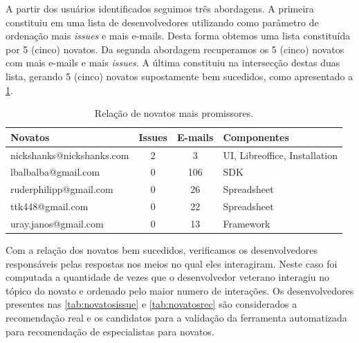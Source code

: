 \documentclass[oneside,brazil,a4paper]{normas-utf-tex}
\begin{document}
A partir dos usuários identificados seguimos três abordagens. A primeira constituiu em uma lista de desenvolvedores utilizando como parâmetro de ordenação mais \textit{issues} e mais e-mails. Desta forma obtemos uma lista constituída por 5 (cinco) novatos. Da segunda abordagem recuperamos os 5 (cinco) novatos com mais e-mails e mais \textit{issues}. A última constituiu na intersecção destas duas lista, gerando 5 (cinco) novatos supostamente bem sucedidos, como apresentado a \cref{tab:novatossucedidos}.

\begin{table}[hbt]
    \centering
    \scriptsize
    \caption{Relação de novatos mais promissores.}
    \label{tab:novatossucedidos}
    \begin{tabular}{|l|c|c|l|}
        \hline
                \textbf{Novatos} & \textbf{Issues} & \textbf{E-mails}  & \textbf{Componentes}\\\hline
                   nickshanks@nickshanks.com  & 2 & 3 & UI, Libreoffice, Installation\\\hline
                   lbalbalba@gmail.com        & 0 & 106 & SDK\\\hline
                   ruderphilipp@gmail.com     & 0 & 26 & Spreadsheet\\\hline
                   ttk448@gmail.com           & 0 & 22 & Spreadsheet\\\hline
                   uray.janos@gmail.com       & 0 & 13 & Framework\\\hline
    \end{tabular}
\end{table}

Com a relação dos novatos bem sucedidos, verificamos os desenvolvedores responsáveis pelas respostas nos meios no qual eles interagiram. Neste caso foi computada a quantidade de vezes que o desenvolvedor veterano interagiu no tópico do novato e ordenado pelo maior numero de interações. Os desenvolvedores presentes nas \cref{tab:novatosissue} e \cref{tab:novatosrec} são considerados a recomendação real e os candidatos para a validação da ferramenta automatizada para recomendação de especialistas para novatos.
\end{document}
